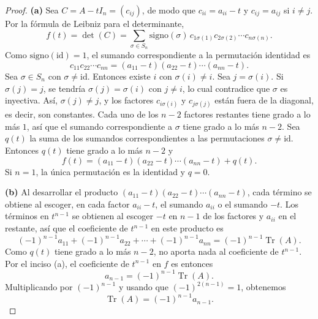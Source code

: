 \documentclass[12pt,a4paper]{article}
\renewcommand{\Tr}{\operatorname{Tr}}
\begin{document}
    \begin{proof}
        \textbf{(a)} Sea $C=A-tI_{n}=(c_{ij})$, de modo que $c_{ii}=a_{ii}-t$ y $c_{ij}=a_{ij}$ si $i\neq j$. Por la fórmula de Leibniz para el determinante,
        \begin{equation*}
            f(t)=\det(C)=\sum_{\sigma\in S_{n}}\text{signo}(\sigma)\,c_{1\sigma(1)}c_{2\sigma(2)}\cdots c_{n\sigma(n)}.
        \end{equation*}
        Como $\text{signo}(\mathrm{id})=1$, el sumando correspondiente a la permutación identidad es
        \begin{equation*}
            c_{11}c_{22}\cdots c_{nn}=(a_{11}-t)(a_{22}-t)\cdots(a_{nn}-t).
        \end{equation*}
        Sea $\sigma\in S_{n}$ con $\sigma\neq\mathrm{id}$. Entonces existe $i$ con $\sigma(i)\neq i$. Sea $j=\sigma(i)$. Si $\sigma(j)=j$, se tendría $\sigma(j)=\sigma(i)$ con $j\neq i$, lo cual contradice que $\sigma$ es inyectiva. Así, $\sigma(j)\neq j$, y los factores $c_{i\sigma(i)}$ y $c_{j\sigma(j)}$ están fuera de la diagonal, es decir, son constantes. Cada uno de los $n-2$ factores restantes tiene grado a lo más $1$, así que el sumando correspondiente a $\sigma$ tiene grado a lo más $n-2$. Sea $q(t)$ la suma de los sumandos correspondientes a las permutaciones $\sigma\neq\mathrm{id}$. Entonces $q(t)$ tiene grado a lo más $n-2$ y
        \begin{equation*}
            f(t)=(a_{11}-t)(a_{22}-t)\cdots(a_{nn}-t)+q(t).
        \end{equation*}
        Si $n=1$, la única permutación es la identidad y $q=0$.

        \textbf{(b)} Al desarrollar el producto $(a_{11}-t)(a_{22}-t)\cdots(a_{nn}-t)$, cada término se obtiene al escoger, en cada factor $a_{ii}-t$, el sumando $a_{ii}$ o el sumando $-t$. Los términos en $t^{n-1}$ se obtienen al escoger $-t$ en $n-1$ de los factores y $a_{ii}$ en el restante, así que el coeficiente de $t^{n-1}$ en este producto es
        \begin{equation*}
            (-1)^{n-1}a_{11}+(-1)^{n-1}a_{22}+\cdots+(-1)^{n-1}a_{nn}=(-1)^{n-1}\Tr(A).
        \end{equation*}
        Como $q(t)$ tiene grado a lo más $n-2$, no aporta nada al coeficiente de $t^{n-1}$. Por el inciso (a), el coeficiente de $t^{n-1}$ en $f$ es entonces
        \begin{equation*}
            a_{n-1}=(-1)^{n-1}\Tr(A).
        \end{equation*}
        Multiplicando por $(-1)^{n-1}$ y usando que $(-1)^{2(n-1)}=1$, obtenemos
        \begin{equation*}
            \Tr(A)=(-1)^{n-1}a_{n-1}.
        \end{equation*}
    \end{proof}
\end{document}
